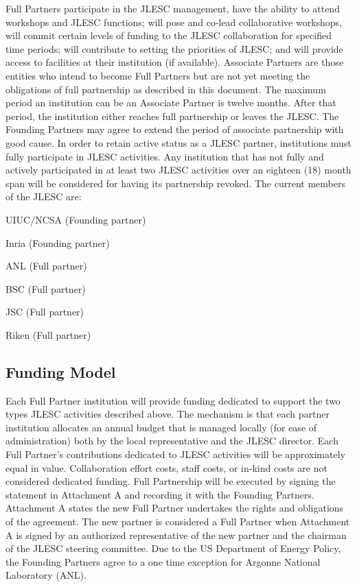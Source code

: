 \documentclass[12pt]{article}
\theoremstyle{definition}
\begin{document}
Full Partners participate in the JLESC management, have the ability to attend workshops and JLESC functions; will pose and co-lead collaborative workshops, will commit certain levels of funding to the JLESC collaboration for specified time periods; will contribute to setting the priorities of JLESC; and will provide access to facilities at their institution (if available).  
Associate Partners are those entities who intend to become Full Partners but are not yet meeting the obligations of full partnership as described in this document.  
The maximum period an institution can be an Associate Partner is twelve months.  After that period, the institution either reaches full partnership or leaves the JLESC. The Founding Partners may agree to extend the period of associate partnership with good cause.
In order to retain active status as a JLESC partner, institutions must fully participate in JLESC activities. Any institution that has not fully and actively participated in at least two JLESC activities over an eighteen (18) month span will be considered for having its partnership revoked. The current members of the JLESC are:
\begin{compactenum}
\item UIUC/NCSA (Founding partner)
\item Inria (Founding partner)
\item ANL (Full partner)
\item BSC (Full partner)
\item JSC (Full partner)
\item Riken (Full partner)
\end{compactenum}

\subsection{Funding Model}
Each Full Partner institution will provide funding dedicated to support the two types JLESC activities described above. The mechanism is that each partner institution allocates an annual budget that is managed locally (for ease of administration) both by the local representative and the JLESC director.  Each Full Partner's contributions dedicated to JLESC activities will be approximately equal in value.  Collaboration effort costs, staff costs, or in-kind costs are not considered dedicated funding.  
Full Partnership will be executed by signing the statement in Attachment A and recording it with the Founding Partners.  Attachment A states the new Full Partner undertakes the rights and obligations of the agreement.  The new partner is considered a Full Partner when Attachment A is signed by an authorized representative of the new partner and the chairman of the JLESC steering committee.  
Due to the US Department of Energy Policy, the Founding Partners agree to a one time exception for Argonne National Laboratory (ANL). 
\end{document}
